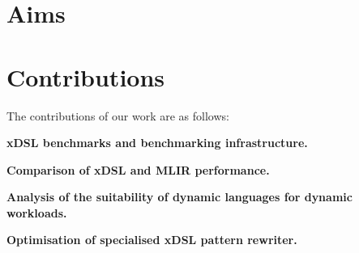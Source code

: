 \section{Aims}
\label{sec:aims}

\section{Contributions}
\label{sec:contributions}


The contributions of our work are as follows:

\textbf{xDSL benchmarks and benchmarking infrastructure.}

\textbf{Comparison of xDSL and MLIR performance.}

\textbf{Analysis of the suitability of dynamic languages for dynamic workloads.}

\textbf{Optimisation of specialised xDSL pattern rewriter.}



